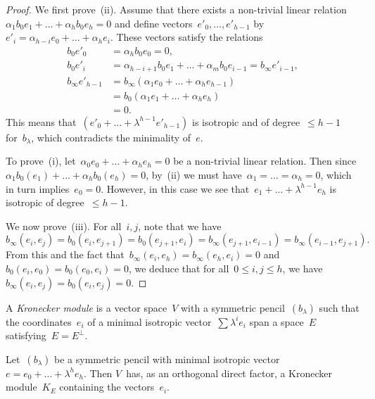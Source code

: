 \documentclass{lms}%
\begin{document}
\begin{proof}
We first prove~(ii). Assume that there exists a non-trivial linear
relation~$α_1 b_0 e_1 + … + α_h b_0 e_{h} = 0$ and define
vectors~$e'_0,…,e'_{h-1}$ by $e'_i = α_{h-i} e_0 + … + α_{h} e_i$. These
vectors satisfy the relations
\begin{equation}\label{eq:relation-e'}
\begin{split}
b_0 e'_0 &= α_h b_0 e_0 = 0, \\
b_0 e'_i &= α_{h-i+1} b_0 e_1 + … + α_m b_0 e_{i-1} = b_{∞} e'_{i-1}, \\
b_{∞} e'_{h-1} &= b_{∞} (α_1 e_{0} + … + α_{h} e_{h-1}) \\
 &= b_{0} (α_1 e_{1} + … + α_{h} e_{h}) \\
 &= 0.
\end{split}
\end{equation}
This means that~$(e'_0+…+λ^{h-1} e'_{h-1})$ is isotropic and of degree~$≤
h-1$ for~$b_{λ}$, which contradicts the minimality of~$e$.

To prove~(i), let~$α_0 e_0 + … + α_h e_h = 0$ be a non-trivial linear
relation. Then since $α_1 b_0(e_1) + … + α_h b_0(e_h) = 0$, by~(ii) we
must have~$α_1 = … = α_h = 0$, which in turn implies~$e_0 = 0$. However,
in this case we see that~$e_1+…+ λ^{h-1} e_h$ is isotropic of degree~$≤
h-1$.

We now prove~(iii). For all~$i, j$, note that we have
\begin{equation}\label{eq:zero-bij}
b_{∞}(e_i,e_j) = b_0(e_i, e_{j+1}) = b_0(e_{j+1}, e_i) =
  b_{∞} (e_{j+1}, e_{i-1}) = b_{∞} (e_{i-1}, e_{j+1}).
\end{equation}
From this and the fact that~$b_{∞} (e_i, e_h) = b_{∞} (e_h, e_i) = 0$
and~$b_0 (e_i, e_0) = b_0 (e_0, e_i) = 0$, we deduce that for all~$0 ≤
i,j ≤ h$, we have~$b_{∞} (e_i, e_j) = b_0 (e_i, e_j) = 0$.
\end{proof}

A \emph{Kronecker module} is a vector space~$V$ with a symmetric
pencil~$(b_{λ})$ such that the coordinates~$e_i$ of a minimal isotropic
vector~$∑ λ^i e_i$ span a space~$E$ satisfying~$E = E^{⟂}$.

\begin{prop}\label{prop:kronecker-split}%
Let~$(b_{λ})$ be a symmetric pencil with minimal isotropic vector~$e =
e_0 + … + λ^h e_h$. Then $V$~has, as an orthogonal direct factor,
a Kronecker module~$K_E$ containing the vectors~$e_i$.
\end{prop}
\end{document}
